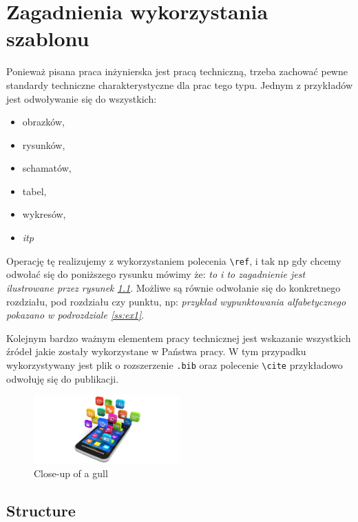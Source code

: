 \chapter{Zagadnienia wykorzystania szablonu}

Ponieważ pisana praca inżynierska jest pracą techniczną, trzeba zachować pewne standardy techniczne charakterystyczne dla prac tego typu. Jednym z przykładów jest odwoływanie się do wszystkich:
\begin{itemize}
    \item obrazków,
    \item rysunków,
    \item schamatów,
    \item tabel,
    \item wykresów,
    \item \textit{itp}
\end{itemize}
Operację tę realizujemy z wykorzystaniem polecenia \texttt{\textbackslash ref}, i tak np gdy chcemy odwołać się do poniższego rysunku mówimy że: \textit{to i to zagadnienie jest ilustrowane przez rysunek \ref{fig:mobile}}. Możliwe są równie odwołanie się do konkretnego rozdziału, pod rozdziału czy punktu, np: \textit{ przykład wypunktowania alfabetycznego pokazano w podrozdziale \ref{ss:ex1}}.

Kolejnym bardzo ważnym elementem pracy technicznej jest wskazanie wszystkich źródeł jakie zostały wykorzystane w Państwa pracy. W tym przypadku wykorzystywany jest plik o rozszerzenie \texttt{.bib} oraz polecenie \texttt{\textbackslash cite} przykładowo odwołuję się do publikacji.\cite{Tomaszewski2000}


\begin{figure}[h!]
  \centering
    \includegraphics[width=0.5\textwidth]{images/mobile-banner}
  \caption{Close-up of a gull}
  \label{fig:mobile}
\end{figure}

\lipsum[1]

\section{Structure}
\lipsum[2]

